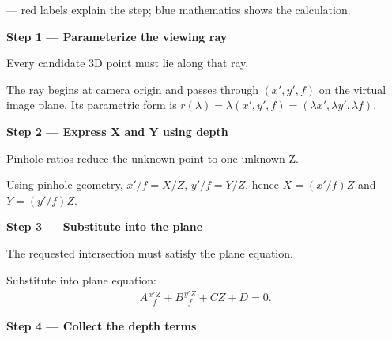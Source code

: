 \documentclass[letterpaper,11pt,english,openany,oneside]{jupyterBook}
\begin{document}
\par\medskip

\sphinxAtStartPar
{} — red labels explain the step; blue mathematics shows the calculation.

\par\medskip{}
{\color{QuizStepRed}\bfseries Step 1 — Parameterize the viewing ray}\par\smallskip

\sphinxAtStartPar
{} Every candidate 3D point must lie along that ray.

\sphinxAtStartPar
The ray begins at camera origin and passes through {\color{QuizMathBlue} \((x',y',f)\)} on the virtual image plane. Its parametric form is {\color{QuizMathBlue} \(r(\lambda)=\lambda(x',y',f)=(\lambda x',\lambda y',\lambda f)\)}.

\par

\par\medskip{}
{\color{QuizStepRed}\bfseries Step 2 — Express X and Y using depth}\par\smallskip

\sphinxAtStartPar
{} Pinhole ratios reduce the unknown point to one unknown Z.

\sphinxAtStartPar
Using pinhole geometry, {\color{QuizMathBlue} \(x'/f=X/Z\)}, {\color{QuizMathBlue} \(y'/f=Y/Z\)}, hence {\color{QuizMathBlue} \(X=(x'/f)Z\)} and {\color{QuizMathBlue} \(Y=(y'/f)Z\)}.

\par

\par\medskip{}
{\color{QuizStepRed}\bfseries Step 3 — Substitute into the plane}\par\smallskip

\sphinxAtStartPar
{} The requested intersection must satisfy the plane equation.

\sphinxAtStartPar
Substitute into plane equation:
{\color{QuizMathBlue} \begin{equation*}
\begin{split}
A\frac{x'Z}{f}+B\frac{y'Z}{f}+CZ+D=0.
\end{split}
\end{equation*}}
\par

\par\medskip{}
{\color{QuizStepRed}\bfseries Step 4 — Collect the depth terms}\par\smallskip
\end{document}
